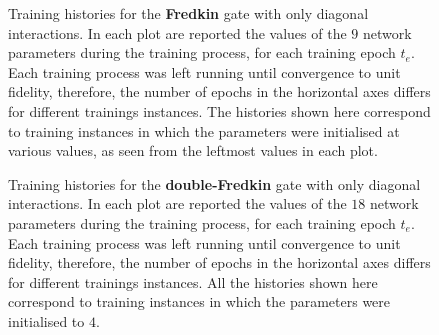 \begin{figure}[htbp]
	\centering
	\caption{
		Training histories for the \textbf{Fredkin} gate with only diagonal interactions.
		In each plot are reported the values of the $9$ network parameters during the training process, for each training epoch $t_e$.
		Each training process was left running until convergence to unit fidelity, therefore, the number of epochs in the horizontal axes differs for different trainings instances.
		The histories shown here correspond to training instances in which the parameters were initialised at various values, as seen from the leftmost values in each plot.
	}
	\label{fig:fredkin_diagonal_parhistories}
\end{figure}

\begin{figure}[htbp]
	\centering
	\caption{
		Training histories for the \textbf{double-Fredkin} gate with only diagonal interactions.
		In each plot are reported the values of the $18$ network parameters during the training process, for each training epoch $t_e$.
		Each training process was left running until convergence to unit fidelity, therefore, the number of epochs in the horizontal axes differs for different trainings instances.
		All the histories shown here correspond to training instances in which the parameters were initialised to $4$.
	}
	\label{fig:doublefredkin_diagonal_parhistories}
\end{figure}

